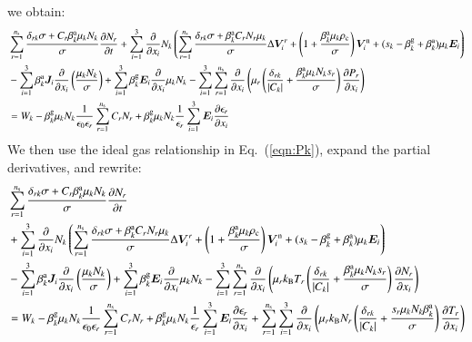 \documentclass{warpdoc}
\newcommand{\alb}{\vspace{0.1cm}\\} %
\newcommand{\ns}{{n_{\rm s}}}
\renewcommand{\vec}[1]{\bm{#1}}
\begin{document}
%
we obtain:
%
\begin{align}
  &\sum_{r=1}^{\ns} \frac{\delta_{rk}\sigma+C_r  \beta_k^{\rm a} \mu_k N_k}{\sigma} \frac{\partial N_r}{\partial t}  
  + \sum_{i=1}^3 \frac{\partial}{\partial x_i}  N_k \left(  \sum_{r=1}^\ns \frac{\delta_{rk}\sigma+ \beta^{\rm a}_k C_r N_r \mu_k}{\sigma}   \Delta \vec{V}_i^r + \left(1+\frac{\beta^{\rm a}_k \mu_k \rho_{\rm c}}{\sigma}\right)\vec{V}^{\rm n}_i + (s_k-\beta_k^{\rm g}+ \beta^{\rm a}_k) \mu_k  \vec{E}_i    \right) 
\nonumber \\
&- \sum_{i=1}^3 \beta_k^{\rm a}\vec{J}_i \frac{\partial}{\partial x_i}  \left( \frac{\mu_k N_k}{\sigma} 
\right) 
+ \sum_{i=1}^3 \beta_k^{\rm g} \vec{E}_i \frac{\partial }{\partial x_i} \mu_{k} N_{k}
- \sum_{i=1}^3 \sum_{r=1}^{\ns} \frac{\partial}{\partial x_i} \left( \mu_r \left( \frac{\delta_{rk}}{|C_k|}+ \frac{ \beta_k^{\rm a} \mu_k N_k s_r  }{\sigma} \right) \frac{\partial P_r}{\partial x_i}\right) 
\nonumber \\
&= W_k
-\beta_k^{\rm g} \mu_{k} N_{k}\frac{1}{\epsilon_0 \epsilon_r} \sum_{r=1}^\ns C_r N_r 
+\beta_k^{\rm g} \mu_{k} N_{k}\frac{1}{\epsilon_r} \sum_{i=1}^3 \vec{E}_i \frac{\partial \epsilon_r}{\partial x_i}  
\end{align}
%
We then use the ideal gas relationship in Eq.\ (\ref{eqn:Pk}), expand the partial derivatives, and rewrite:
%
\begin{align}
  &\sum_{r=1}^{\ns} \frac{\delta_{rk}\sigma+C_r  \beta_k^{\rm a} \mu_k N_k}{\sigma} \frac{\partial N_r}{\partial t}  \nonumber\alb
  &+ \sum_{i=1}^3 \frac{\partial}{\partial x_i}  N_k \left(  \sum_{r=1}^\ns \frac{\delta_{rk}\sigma+ \beta^{\rm a}_k C_r N_r \mu_k}{\sigma}   \Delta \vec{V}_i^r + \left(1+\frac{\beta^{\rm a}_k \mu_k \rho_{\rm c}}{\sigma}\right)\vec{V}^{\rm n}_i + (s_k-\beta_k^{\rm g}+ \beta^{\rm a}_k) \mu_k  \vec{E}_i    \right) 
\nonumber \\
&- \sum_{i=1}^3 \beta_k^{\rm a}\vec{J}_i \frac{\partial}{\partial x_i}  \left( \frac{\mu_k N_k}{\sigma} 
\right) 
+ \sum_{i=1}^3 \beta_k^{\rm g} \vec{E}_i \frac{\partial }{\partial x_i} \mu_{k} N_{k}
- \sum_{i=1}^3 \sum_{r=1}^{\ns} \frac{\partial}{\partial x_i} \left(\mu_r k_{\rm B} T_r\left(\frac{ \delta_{rk} }{ |C_k|}+   \frac{ \beta_k^{\rm a}\mu_k N_k s_r}{\sigma}\right)  \frac{\partial N_r}{\partial x_i}\right) 
\nonumber \\
&= W_k
-\beta_k^{\rm g} \mu_{k} N_{k}\frac{1}{\epsilon_0 \epsilon_r} \sum_{r=1}^\ns C_r N_r 
+\beta_k^{\rm g} \mu_{k} N_{k}\frac{1}{\epsilon_r} \sum_{i=1}^3 \vec{E}_i \frac{\partial \epsilon_r}{\partial x_i}  
+ \sum_{r=1}^\ns \sum_{i=1}^3  \frac{\partial}{\partial x_i} \left( \mu_r k_{\rm B} N_r   \left(\frac{\delta_{rk}}{|C_k|}+\frac{s_r \mu_k N_k \beta_k^{\rm a}}{\sigma}\right)  \frac{\partial T_r}{\partial x_i} \right)
\end{align}
\end{document}
